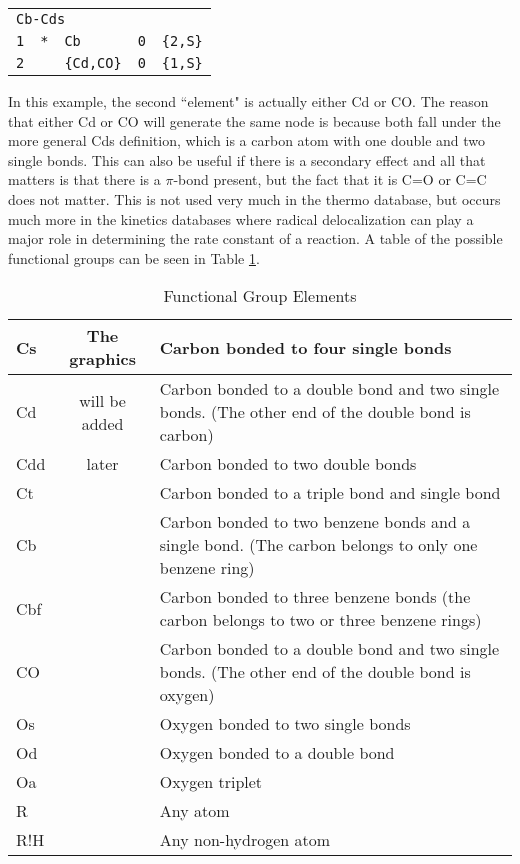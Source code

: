 \documentclass[12pt,letterpaper]{article}
\begin{document}
\begin{tabular}{lllll}
\multicolumn{5}{l}{\texttt{Cb-Cds}} \\
\texttt{1} &  \texttt{*} &  \texttt{Cb} & \texttt{0} & \texttt{\{2,S\}} \\
\texttt{2} &             &  \texttt{\{Cd,CO\}} &  \texttt{0} & \texttt{\{1,S\}}
\end{tabular}

In this example, the second ``element" is actually either Cd or CO. The
reason that either Cd or CO will generate the same node is because both
fall under the more general Cds definition, which is a carbon atom with one
double and two single bonds. This can also be useful if there is a secondary
effect and all that matters is that there is a $\pi$-bond present, but the fact that
it is C=O or C=C does not matter. This is not used very much in
the thermo database, but occurs much more in the kinetics databases where
radical delocalization can play a major role in determining the rate constant
of a reaction. A table of the possible functional groups can be seen in Table \ref{functional group table}.

\begin{table}
\begin{tabular}{|l|c|p{9cm}|} \hline
Cs  & The graphics & Carbon bonded to four single bonds \\ \hline
Cd  & will be added & Carbon bonded to a double bond and two single bonds.  (The other end of the double bond is carbon) \\ \hline
Cdd & later & Carbon bonded to two double bonds \\ \hline
Ct  & & Carbon bonded to a triple bond and single bond \\ \hline
Cb  & & Carbon bonded to two benzene bonds and a single bond.  (The carbon belongs to only one benzene ring) \\ \hline
Cbf & & Carbon bonded to three benzene bonds (the carbon belongs to two or three benzene rings) \\ \hline
CO  & & Carbon bonded to a double bond and two single bonds.  (The other end of the double bond is oxygen) \\ \hline
Os  & & Oxygen bonded to two single bonds \\ \hline
Od  & & Oxygen bonded to a double bond \\ \hline
Oa  & & Oxygen triplet \\ \hline
R   & & Any atom \\ \hline
R!H & & Any non-hydrogen atom \\ \hline
\end{tabular}
\caption{Functional Group Elements}
\label{functional group table}
\end{table}
\end{document}
